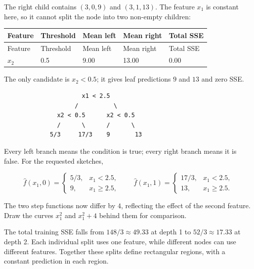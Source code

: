 \documentclass[10pt]{article}
\begin{document}
The right child contains $(3,0,9)$ and $(3,1,13)$. The feature $x_1$ is
constant here, so it cannot split the node into two non-empty children:

\begingroup
\small
\setlength{\tabcolsep}{4pt}
\begin{longtable}{l|l|l|l|l}
Feature & Threshold & Mean left & Mean right & Total SSE \\
\hline
\endfirsthead
Feature & Threshold & Mean left & Mean right & Total SSE \\
\hline
\endhead
$x_2$ & 0.5 & 9.00 & 13.00 & 0.00 \\[1.5pt]
\end{longtable}
\endgroup
The only candidate is $x_2<0.5$; it gives leaf predictions $9$ and $13$
and zero SSE.

\begin{verbatim}
                      x1 < 2.5
                    /          \
               x2 < 0.5      x2 < 0.5
               /      \      /      \
             5/3     17/3    9       13
\end{verbatim}
Every left branch means the condition is true; every right branch means
it is false. For the requested sketches,

\[
\hat f(x_1,0)=\begin{cases}5/3,&x_1<2.5,\\9,&x_1\geq2.5,\end{cases}
\qquad
\hat f(x_1,1)=\begin{cases}17/3,&x_1<2.5,\\13,&x_1\geq2.5.\end{cases}
\]

The two step functions now differ by $4$, reflecting the effect of the
second feature. Draw the curves $x_1^2$ and $x_1^2+4$ behind them for
comparison.

The total training SSE falls from $148/3\approx49.33$ at depth 1 to
$52/3\approx17.33$ at depth 2. Each individual split uses one feature,
while different nodes can use different features. Together these splits
define rectangular regions, with a constant prediction in each region.
\end{document}
